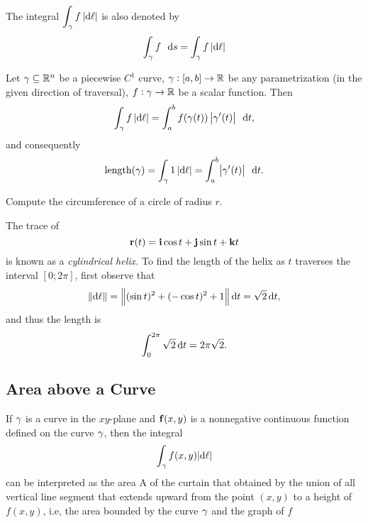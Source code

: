 The integral $\dint_\caminho f \, \abs{\dif \ell}$ is also denoted by
 \[\dint_\caminho f \,\ds= \dint_\caminho f \, \abs{\dif \ell}\]
  \begin{thm}
    Let $\gamma \subseteq \mathbb{R}^n$ be a piecewise $C^1$ curve, $\gamma:[a, b] \to \mathbb{R}$ be any parametrization (in the given direction of traversal), $f:\gamma \to \mathbb{R}$ be a scalar function.   Then
    \begin{equation*}
      \dint_\caminho f \, \abs{\dif \ell}
	= \dint_a^b f(\gamma(t)) \, \abs{\gamma'(t)} \, \dt,
    \end{equation*}
    and consequently
    \begin{equation*}
      \arclen(\caminho)
	= \dint_\caminho 1 \, \abs{\dif \ell}
	= \dint_a^b \abs{\gamma'(t)} \, \dt.
    \end{equation*}
  \end{thm}

  \begin{exa}
    Compute the circumference of a circle of radius $r$. 
  \end{exa}
  
\begin{exa}
The trace of
$${\mathbf r}(t) = \mathbf{ i}\cos t + \mathbf{ j}\sin t +
\mathbf{ k}t$$is known as a {\em cylindrical helix.} To find the
length of the helix as $t$ traverses the interval $[0;2\pi]$, first
observe that
$$ \norm{\d \ell} = \norm{(\sin t)^2+(-\cos t)^2+1}\d{t} = \sqrt{2}\d{t},
$$and thus the length is
$$ \int _0 ^{2\pi}  \sqrt{2}\d{t}= 2\pi\sqrt{2}.    $$
\label{exa:helix_1}   
\end{exa}
  
   \subsection{Area above a Curve}
 
If $\gamma$ is a curve in the $xy$-plane and $\mathbf{ f}(x, y)$ is a nonnegative continuous function
defined on the curve $\gamma$, then the integral 
\[\dint_\caminho f(x, y) \abs{\dif \ell} \] can be interpreted as the area A of the curtain that
obtained by the union of all vertical line segment that extends upward from the point $(x, y)$ to a
height of $f(x, y)$, i.e, the area bounded by the curve $\gamma$ and the graph of $f$

